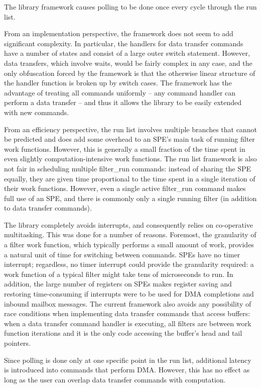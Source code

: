 The library framework causes polling to be done once every cycle through the run list.

From an implementation perspective, the framework does not seem to add significant complexity. In particular, the handlers for data transfer commands have a number of states and consist of a large outer \textsf{switch} statement. However, data transfers, which involve waits, would be fairly complex in any case, and the only obfuscation forced by the framework is that the otherwise linear structure of the handler function is broken up by \textsf{switch} cases. The framework has the advantage of treating all commands uniformly -- any command handler can perform a data transfer -- and thus it allows the library to be easily extended with new commands.

From an efficiency perspective, the run list involves multiple branches that cannot be predicted and does add some overhead to an SPE's main task of running filter work functions. However, this is generally a small fraction of the time spent in even slightly computation-intensive work functions. The run list framework is also not fair in scheduling multiple \textsf{filter\_run} commands: instead of sharing the SPE equally, they are given time proportional to the time spent in a single iteration of their work functions. However, even a single active \textsf{filter\_run} command makes full use of an SPE, and there is commonly only a single running filter (in addition to data transfer commands).

The library completely avoids interrupts, and consequently relies on co-operative multitasking. This was done for a number of reasons. Foremost, the granularity of a filter work function, which typically performs a small amount of work, provides a natural unit of time for switching between commands. SPEs have no timer interrupt; regardless, no timer interrupt could provide the granularity required: a work function of a typical filter might take tens of microseconds to run. In addition, the large number of registers on SPEs makes register saving and restoring time-consuming if interrupts were to be used for DMA completions and inbound mailbox messages. The current framework also avoids any possibility of race conditions when implementing data transfer commands that access buffers: when a data transfer command handler is executing, all filters are between work function iterations and it is the only code accessing the buffer's head and tail pointers.

Since polling is done only at one specific point in the run list, additional latency is introduced into commands that perform DMA. However, this has no effect as long as the user can overlap data transfer commands with computation.
 
